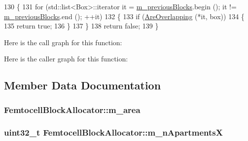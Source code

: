 \begin{DoxyCode}
130 \{
131   \textcolor{keywordflow}{for} (std::list<Box>::iterator it = \hyperlink{classFemtocellBlockAllocator_a072952eb05ffe7ce2bdf6dc34e46a8ee}{m\_previousBlocks}.begin (); it != 
      \hyperlink{classFemtocellBlockAllocator_a072952eb05ffe7ce2bdf6dc34e46a8ee}{m\_previousBlocks}.end (); ++it)
132     \{
133       \textcolor{keywordflow}{if} (\hyperlink{lena-dual-stripe_8cc_a1afb216dd9cb3e096360a211c59259dd}{AreOverlapping} (*it, box))
134         \{
135           \textcolor{keywordflow}{return} \textcolor{keyword}{true};
136         \}
137     \}
138   \textcolor{keywordflow}{return} \textcolor{keyword}{false};
139 \}
\end{DoxyCode}


Here is the call graph for this function\+:




Here is the caller graph for this function\+:




\subsection{Member Data Documentation}
\subsubsection[{\texorpdfstring{m\+\_\+area}{m_area}}]{ Femtocell\+Block\+Allocator\+::m\+\_\+area\hspace{0.3cm}{\ttfamily [private]}}\hypertarget{classFemtocellBlockAllocator_a61d8cddd4c64b4ee0bd8ade94e7c2e1f}{}\label{classFemtocellBlockAllocator_a61d8cddd4c64b4ee0bd8ade94e7c2e1f}
\subsubsection[{\texorpdfstring{m\+\_\+n\+ApartmentsX}{m_nApartmentsX}}]{\setlength{\rightskip}{0pt plus 5cm}uint32\+\_\+t Femtocell\+Block\+Allocator\+::m\+\_\+n\+ApartmentsX\hspace{0.3cm}{\ttfamily [private]}}\hypertarget{classFemtocellBlockAllocator_a4c70ae4a834b60d201123be0d027a534}{}\label{classFemtocellBlockAllocator_a4c70ae4a834b60d201123be0d027a534}
